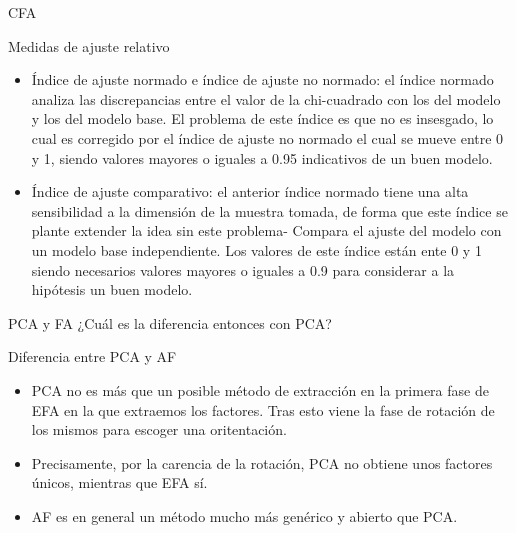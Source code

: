 \documentclass[10pt]{beamer}
\begin{document}
\begin{frame}[fragile]{CFA}
\vspace{10px}
\pause
{}
\begin{block}{Medidas de ajuste relativo}
	\begin{itemize}
		\item Índice de ajuste normado e índice de ajuste no normado: el índice normado analiza las discrepancias entre el valor de la chi-cuadrado con los del modelo y los del modelo base. El problema de este índice es que no es insesgado, lo cual es corregido por el índice de ajuste no normado el cual se mueve entre 0 y 1, siendo valores mayores o iguales a 0.95 indicativos de un buen modelo.
		\item Índice de ajuste comparativo: el anterior índice normado tiene una alta sensibilidad a la dimensión de la muestra tomada, de forma que este índice se plante extender la idea sin este problema- Compara el ajuste del modelo con un modelo base independiente. Los valores de este índice están ente 0 y 1 siendo necesarios valores mayores o iguales a 0.9 para considerar a la hipótesis un buen modelo.
	\end{itemize}
\end{block}
\end{frame}

\begin{frame}[fragile]{PCA y FA}
¿Cuál es la diferencia entonces con PCA?
\vspace{10px}
\pause
{}
\begin{alertblock}{Diferencia entre PCA y AF}
	\begin{itemize}
		\item PCA no es más que un posible método de extracción en la primera fase de EFA en la que extraemos los factores. Tras esto viene la fase de rotación de los mismos para escoger una oritentación.
		\item Precisamente, por la carencia de la rotación, PCA no obtiene unos factores únicos, mientras que EFA sí. 
		\item AF es en general un método mucho más genérico y abierto que PCA.
	\end{itemize}
\end{alertblock}
\end{frame}

\end{document}
